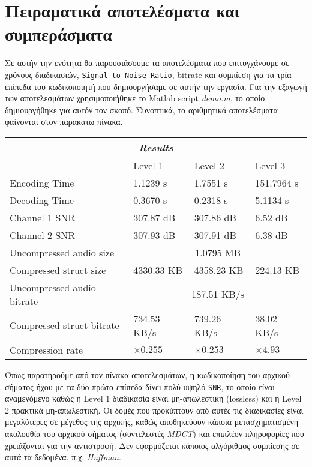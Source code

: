 \section*{Πειραματικά αποτελέσματα και συμπεράσματα}
Σε αυτήν την ενότητα θα παρουσιάσουμε τα αποτελέσματα που επιτυγχάνουμε σε
χρόνους διαδικασιών, \verb|Signal-to-Noise-Ratio|, bitrate και συμπίεση για τα
τρία επίπεδα του κωδικοποιητή που δημιουργήσαμε σε αυτήν την εργασία. Για την
εξαγωγή των αποτελεσμάτων χρησιμοποιήθηκε το Matlab script \emph{demo.m}, το
οποίο δημιουργήθηκε για αυτόν τον σκοπό. Συνοπτικά, τα αριθμητικά αποτελέσματα
φαίνονται στον παρακάτω πίνακα.

\usepackage{multirow}

\begin{center}
  \begin{tabular}{l | l | l | l}
    \multicolumn{4}{c}{\emph{Results}} \\ \hline
      & Level 1 & Level 2 & Level 3 \\ \hline
    Encoding Time & 1.1239 s & 1.7551 s & 151.7964 s \\ \hline
    Decoding Time & 0.3670 s & 0.2318 s & 5.1134 s \\ \hline
    Channel 1 SNR & 307.87 dB & 307.86 dB & 6.52 dB \\ \hline
    Channel 2 SNR & 307.93 dB & 307.91 dB & 6.38 dB \\ \hline
    Uncompressed audio size & \multicolumn{3}{c}{1.0795 MB} \\ \hline
    Compressed struct size & 4330.33 KB & 4358.23 KB & 224.13 KB \\ \hline
    Uncompressed audio bitrate & \multicolumn{3}{c}{187.51 KB/s} \\ \hline
    Compressed struct bitrate & 734.53 KB/s & 739.26 KB/s & 38.02 KB/s \\ \hline
    Compression rate & $\times 0.255$ & $\times 0.253$ & $\times 4.93$ \\
  \end{tabular}
\end{center}

Όπως παρατηρούμε από τον πίνακα αποτελεσμάτων, η κωδικοποίηση του αρχικού σήματος
ήχου με τα δύο πρώτα επίπεδα δίνει πολύ υψηλό \verb|SNR|, το οποίο είναι αναμενόμενο
καθώς η Level 1 διαδικασία είναι μη-απωλεστική (lossless) και η Level 2 πρακτικά
μη-απωλεστική. Οι δομές που προκύπτουν από αυτές τις διαδικασίες είναι μεγαλύτερες
σε μέγεθος της αρχικής, καθώς αποθηκεύουν κάποια μετασχηματισμένη ακολουθία του
αρχικού σήματος (συντελεστές \emph{MDCT}) και επιπλέον πληροφορίες που χρειάζονται
για την αντιστροφή. Δεν εφαρμόζεται κάποιος αλγόριθμος συμπίεσης σε αυτά τα δεδομένα,
π.χ. \emph{Huffman}.

